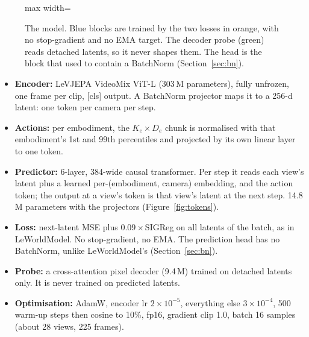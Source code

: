 \documentclass[10pt]{article}
\begin{document}
\begin{figure}[H]
\begin{adjustbox}{max width=\linewidth}
\end{adjustbox}
\caption{The model. Blue blocks are trained by the two losses in orange, with no
stop-gradient and no EMA target. The decoder probe (green) reads detached latents, so it
never shapes them. The head is the block that used to contain a BatchNorm
(Section~\ref{sec:bn}).}
\label{fig:arch}
\end{figure}

\begin{itemize}
\item \textbf{Encoder:} LeVJEPA VideoMix ViT-L (303\,M parameters), fully unfrozen, one
  frame per clip, [cls] output. A BatchNorm projector maps it to a 256-d latent: one token
  per camera per step.
\item \textbf{Actions:} per embodiment, the $K_e \times D_e$ chunk is normalised with that
  embodiment's 1st and 99th percentiles and projected by its own linear layer to one token.
\item \textbf{Predictor:} 6-layer, 384-wide causal transformer. Per step it reads each
  view's latent plus a learned per-(embodiment, camera) embedding, and the action token; the
  output at a view's token is that view's latent at the next step. 14.8\,M parameters with
  the projectors (Figure~\ref{fig:tokens}).
\item \textbf{Loss:} next-latent MSE plus $0.09\times$SIGReg on all latents of the batch, as
  in LeWorldModel. No stop-gradient, no EMA. The prediction head has no BatchNorm, unlike
  LeWorldModel's (Section~\ref{sec:bn}).
\item \textbf{Probe:} a cross-attention pixel decoder (9.4\,M) trained on detached latents
  only. It is never trained on predicted latents.
\item \textbf{Optimisation:} AdamW, encoder lr $2\times10^{-5}$, everything else
  $3\times10^{-4}$, 500 warm-up steps then cosine to 10\%, fp16, gradient clip 1.0, batch 16
  samples (about 28 views, 225 frames).
\end{itemize}
\end{document}
